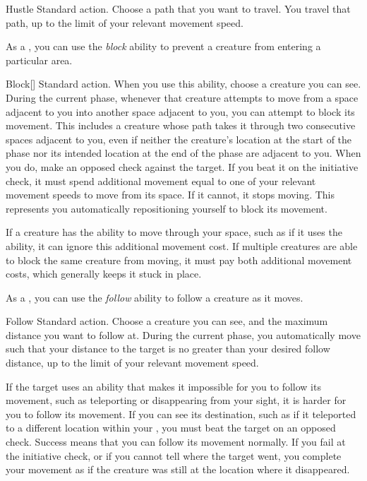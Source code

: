     \begin{activeability}{Hustle}
      \abilityusagetime Standard action.
      \rankline
      Choose a path that you want to travel.
      You travel that path, up to the limit of your relevant movement speed.
    \end{activeability}

     As a , you can use the \textit{block} ability to prevent a creature from entering a particular area.

    \begin{activeability}{Block}[]
      \abilityusagetime Standard action.
      \rankline
      When you use this ability, choose a creature you can see.
      During the current phase, whenever that creature attempts to move from a space adjacent to you into another space adjacent to you, you can attempt to block its movement.
      This includes a creature whose path takes it through two consecutive spaces adjacent to you, even if neither the creature's location at the start of the phase nor its intended location at the end of the phase are adjacent to you.
      When you do, make an opposed  check against the target.
      If you beat it on the initiative check, it must spend additional movement equal to one of your relevant movement speeds to move from its space.
      If it cannot, it stops moving.
      This represents you automatically repositioning yourself to block its movement.

      If a creature has the ability to move through your space, such as if it uses the  ability, it can ignore this additional movement cost.
      If multiple creatures are able to block the same creature from moving, it must pay both additional movement costs, which generally keeps it stuck in place.
    \end{activeability}

     As a , you can use the \textit{follow} ability to follow a creature as it moves.

    \begin{activeability}{Follow}
      \abilityusagetime Standard action.
      \rankline
      Choose a creature you can see, and the maximum distance you want to follow at.
      During the current phase, you automatically move such that your distance to the target is no greater than your desired follow distance, up to the limit of your relevant movement speed.

      If the target uses an ability that makes it impossible for you to follow its movement, such as teleporting or disappearing from your sight, it is harder for you to follow its movement.
      If you can see its destination, such as if it teleported to a different location within your , you must beat the target on an opposed  check.
      Success means that you can follow its movement normally.
      If you fail at the initiative check, or if you cannot tell where the target went, you complete your movement as if the creature was still at the location where it disappeared.
    \end{activeability}

